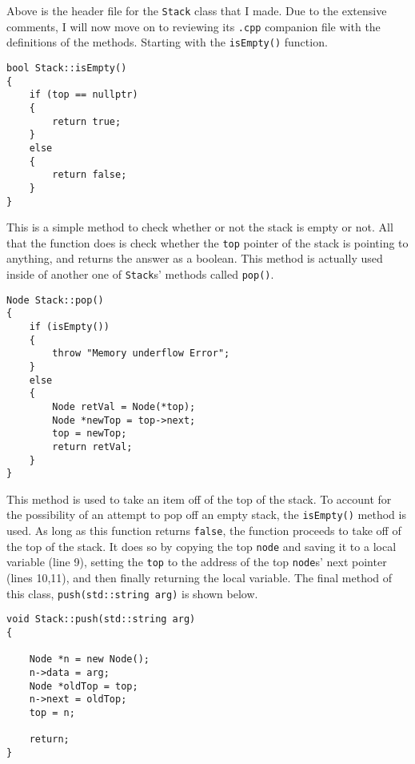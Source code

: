 \documentclass[letterpaper, 10pt]{article}
\begin{document}
Above is the header file for the \texttt{Stack} class that I made. Due to the extensive comments, I will now move on to reviewing its \texttt{.cpp} companion file with the definitions of the methods. Starting with the \texttt{isEmpty()} function.

\begin{addmargin}[-5em]{1em}
\begin{small}
\begin{verbatim}
bool Stack::isEmpty()
{
    if (top == nullptr)
    {
        return true;
    }
    else
    {
        return false;
    }
}
\end{verbatim}
\end{small}
\end{addmargin}
This is a simple method to check whether or not the stack is empty or not. All that the function does is check whether the \texttt{top} pointer of the stack is pointing to anything,  and returns the answer as a boolean. This method is actually used inside of another one of \texttt{Stack}s' methods called \texttt{pop()}.




\begin{addmargin}[-5em]{1em}
\begin{small}
\begin{verbatim}
Node Stack::pop()
{
    if (isEmpty())
    {
        throw "Memory underflow Error";
    }
    else
    {
        Node retVal = Node(*top);
        Node *newTop = top->next;
        top = newTop;
        return retVal;
    }
}

\end{verbatim}
\end{small}
\end{addmargin}
This method is used to take an item off of the top of the stack. To account for the possibility of an attempt to pop off an empty stack, the \texttt{isEmpty()} method is used. As long as this function returns \texttt{false}, the function proceeds to take off of the top of the stack. It does so by copying the top \texttt{node} and saving it to a local variable (line 9), setting the \texttt{top} to the address of the top \texttt{node}s' next pointer  (lines 10,11), and then finally returning the local variable. The final method of this class, \texttt{push(std::string arg)} is shown below.



\begin{addmargin}[-5em]{1em}
\begin{small}
\begin{verbatim}
void Stack::push(std::string arg)
{

    Node *n = new Node();
    n->data = arg;
    Node *oldTop = top;
    n->next = oldTop;
    top = n;

    return;
} 
\end{verbatim}

\end{small}
\end{addmargin}
\end{document}
